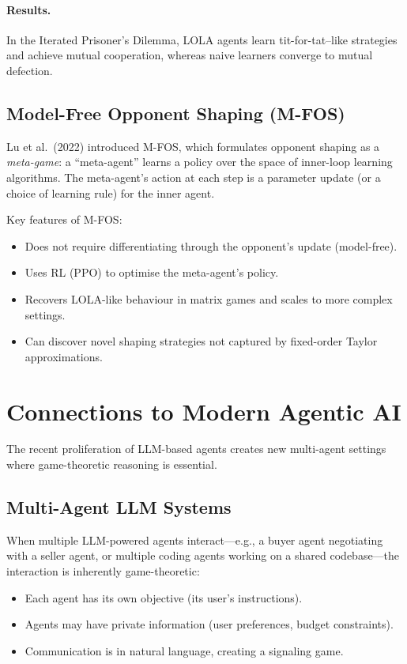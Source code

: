 \documentclass[11pt,a4paper]{article}
\theoremstyle{plain}
\theoremstyle{definition}
\begin{document}
\paragraph{Results.}
In the Iterated Prisoner's Dilemma, LOLA agents learn tit-for-tat--like
strategies and achieve mutual cooperation, whereas naive learners
converge to mutual defection.

\subsection{Model-Free Opponent Shaping (M-FOS)}

Lu et al.\ (2022) introduced M-FOS, which formulates opponent shaping as
a \emph{meta-game}: a ``meta-agent'' learns a policy over the space of
inner-loop learning algorithms.  The meta-agent's action at each step is
a parameter update (or a choice of learning rule) for the inner agent.

Key features of M-FOS:
\begin{itemize}
  \item Does not require differentiating through the opponent's update
    (model-free).
  \item Uses RL (PPO) to optimise the meta-agent's policy.
  \item Recovers LOLA-like behaviour in matrix games and scales to more
    complex settings.
  \item Can discover novel shaping strategies not captured by fixed-order
    Taylor approximations.
\end{itemize}

\section{Connections to Modern Agentic AI}\label{sec:agentic}

The recent proliferation of LLM-based agents creates new multi-agent
settings where game-theoretic reasoning is essential.

\subsection{Multi-Agent LLM Systems}

When multiple LLM-powered agents interact---e.g., a buyer agent
negotiating with a seller agent, or multiple coding agents working on a
shared codebase---the interaction is inherently game-theoretic:
\begin{itemize}
  \item Each agent has its own objective (its user's instructions).
  \item Agents may have private information (user preferences, budget
    constraints).
  \item Communication is in natural language, creating a signaling game.
\end{itemize}
\end{document}
